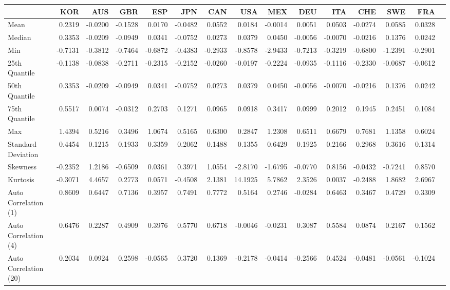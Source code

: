 \begin{tabular}{l|r|r|r|r|r|r|r|r|r|r|r|r|r|r}
\toprule
{} &     KOR &     AUS &     GBR &     ESP &     JPN &     CAN &      USA &     MEX &     DEU &     ITA &     CHE &     SWE &     FRA \\
\midrule
Mean                  &  0.2319 & -0.0200 & -0.1528 &  0.0170 & -0.0482 &  0.0552 &   0.0184 & -0.0014 &  0.0051 &  0.0503 & -0.0274 &  0.0585 &  0.0328 \\
Median                &  0.3353 & -0.0209 & -0.0949 &  0.0341 & -0.0752 &  0.0273 &   0.0379 &  0.0450 & -0.0056 & -0.0070 & -0.0216 &  0.1376 &  0.0242 \\
Min                   & -0.7131 & -0.3812 & -0.7464 & -0.6872 & -0.4383 & -0.2933 &  -0.8578 & -2.9433 & -0.7213 & -0.3219 & -0.6800 & -1.2391 & -0.2901 \\
25th Quantile         & -0.1138 & -0.0838 & -0.2711 & -0.2315 & -0.2152 & -0.0260 &  -0.0197 & -0.2224 & -0.0935 & -0.1116 & -0.2330 & -0.0687 & -0.0612 \\
50th Quantile         &  0.3353 & -0.0209 & -0.0949 &  0.0341 & -0.0752 &  0.0273 &   0.0379 &  0.0450 & -0.0056 & -0.0070 & -0.0216 &  0.1376 &  0.0242 \\
75th Quantile         &  0.5517 &  0.0074 & -0.0312 &  0.2703 &  0.1271 &  0.0965 &   0.0918 &  0.3417 &  0.0999 &  0.2012 &  0.1945 &  0.2451 &  0.1084 \\
Max                   &  1.4394 &  0.5216 &  0.3496 &  1.0674 &  0.5165 &  0.6300 &   0.2847 &  1.2308 &  0.6511 &  0.6679 &  0.7681 &  1.1358 &  0.6024 \\
Standard Deviation    &  0.4454 &  0.1215 &  0.1933 &  0.3359 &  0.2062 &  0.1488 &   0.1355 &  0.6429 &  0.1925 &  0.2166 &  0.2968 &  0.3616 &  0.1314 \\
Skewness              & -0.2352 &  1.2186 & -0.6509 &  0.0361 &  0.3971 &  1.0554 &  -2.8170 & -1.6795 & -0.0770 &  0.8156 & -0.0432 & -0.7241 &  0.8570 \\
Kurtosis              & -0.3071 &  4.4657 &  0.2773 &  0.0571 & -0.4508 &  2.1381 &  14.1925 &  5.7862 &  2.3526 &  0.0037 & -0.2488 &  1.8682 &  2.6967 \\
Auto Correlation (1)  &  0.8609 &  0.6447 &  0.7136 &  0.3957 &  0.7491 &  0.7772 &   0.5164 &  0.2746 & -0.0284 &  0.6463 &  0.3467 &  0.4729 &  0.3309 \\
Auto Correlation (4)  &  0.6476 &  0.2287 &  0.4909 &  0.3976 &  0.5770 &  0.6718 &  -0.0046 & -0.0231 &  0.3087 &  0.5584 &  0.0874 &  0.2167 &  0.1562 \\
Auto Correlation (20) &  0.2034 &  0.0924 &  0.2598 & -0.0565 &  0.3720 &  0.1369 &  -0.2178 & -0.0414 & -0.2566 &  0.4524 & -0.0481 & -0.0561 & -0.1024 \\
\bottomrule
\end{tabular}

